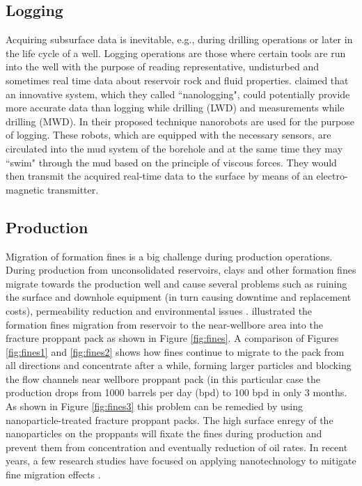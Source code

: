 \subsection{Logging}
Acquiring subsurface data is inevitable, e.g., during drilling operations or later in the life cycle of a well. Logging operations are those where certain tools are run into the well with the purpose of reading representative, undisturbed and sometimes real time data about reservoir rock and fluid properties. \citet{Singh2006} claimed that an innovative system, which they called  ``nanologging", could potentially provide more accurate data than logging while drilling (LWD) and measurements while drilling (MWD). In their proposed technique nanorobots are used for the purpose of logging. These robots, which are equipped with the necessary sensors, are circulated into the mud system of the borehole and at the same time they may ``swim" through the mud based on the principle of viscous forces. They would then transmit the acquired real-time data to the surface by means of an electro-magnetic transmitter. 

\subsection{Production}
Migration of formation fines  is a big challenge during production operations. During production from unconsolidated reservoirs, clays and other formation fines migrate towards the production well and cause several problems such as ruining the surface and downhole equipment (in turn causing downtime and replacement costs), permeability reduction and environmental issues \citep{Tiffin1998}. \citet{Huang2008} illustrated the formation fines migration from reservoir to the near-wellbore area into the fracture proppant pack as shown in Figure \ref{fig:fines}. A comparison of Figures \ref{fig:fines1} and \ref{fig:fines2} shows how fines continue to migrate to the pack from all directions and concentrate after a while, forming larger particles and blocking the flow channels near wellbore proppant pack (in this particular case the production drops from 1000 barrels per day (bpd) to 100 bpd in only 3 months. As shown in Figure \ref{fig:fines3} this problem can be remedied by using nanoparticle-treated fracture proppant packs. The high surface enregy of the nanoparticles on the proppants will fixate the fines during production and prevent them from concentration and eventually reduction of oil rates. In recent years, a few research studies have focused on applying nanotechnology to mitigate fine migration effects \citep{Belcher2010,Habibi2011,Ogolo2012,Ahmadi2013}.

